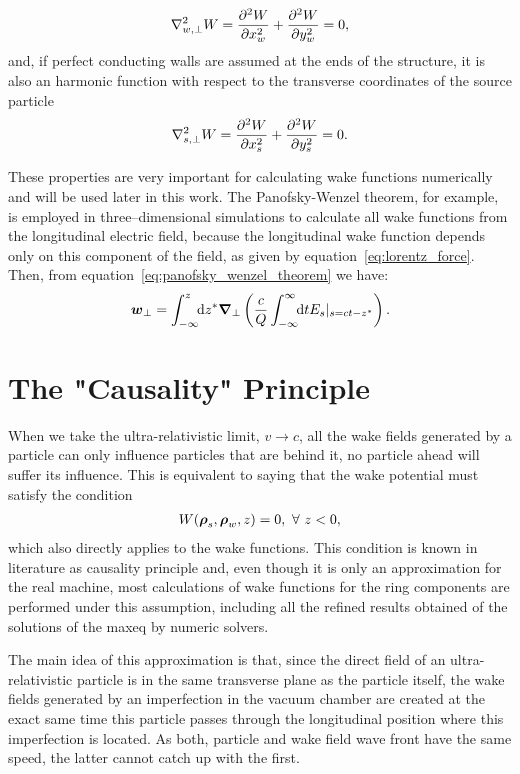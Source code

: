     \begin{align}\label{eq:potential_harmonic}
  	  	\nabla^2_{w,\perp} W = \derpar[2]{W}{x_w} + \derpar[2]{W}{y_w} = 0,
    \end{align}
    and, if perfect conducting walls are assumed at the ends of the structure, it is also an harmonic function with respect to the transverse coordinates of the source particle~\cite{Zagorodnov2015}
    \begin{align}\label{eq:potential_harmonic_source}
  	  	\nabla^2_{s,\perp} W = \derpar[2]{W}{x_s} + \derpar[2]{W}{y_s} = 0.
    \end{align}

    These properties are very important for calculating wake functions numerically and will be used later in this work. The Panofsky-Wenzel theorem, for example, is employed in three--dimensional simulations to calculate all wake functions from the longitudinal electric field, because the longitudinal wake function depends only on this component of the field, as given by equation~\eqref{eq:lorentz_force}. Then, from equation~\eqref{eq:panofsky_wenzel_theorem} we have:
    \begin{align}
  	  	\vect{w}_\perp = \defint{z^*}{\vect{\nabla}_\perp\left(\frac{c}{Q}\infint{t}{E_s|_{s=ct-z^*}}\right)}{-\infty}{z}.
    \end{align}

\section{The "Causality" Principle}

    When we take the ultra-relativistic limit, $v \to c$, all the wake fields generated by a particle can only influence particles that are behind it, no particle ahead will suffer its influence. This is equivalent to saying that the wake potential must satisfy the condition
    \begin{align}
  	  	W(\vect{\rho}_s, \vect{\rho}_w, z) = 0, \,\,  \forall\,\, z < 0,
    \end{align}
    which also directly applies to the wake functions. This condition is known in literature as causality principle and, even though it is only an approximation for the real machine, most calculations of wake functions for the ring components are performed under this assumption, including all the refined results obtained of the solutions of the \gls{maxeq} by numeric solvers.

    The main idea of this approximation is that, since the direct field of an ultra-relativistic particle is in the same transverse plane as the particle itself, the wake fields generated by an imperfection in the vacuum chamber are created at the exact same time this particle passes through the longitudinal position where this imperfection is located. As both, particle and wake field wave front have the same speed, the latter cannot catch up with the first.

